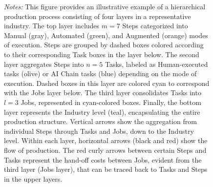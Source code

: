 \documentclass{article}
\begin{document}
\begin{figure}[ht]
\begin{center}
\begin{adjustbox}{center,trim=0pt 0pt 0pt 0pt,clip,margin=-2cm 0cm}
  \end{adjustbox}
  \end{center}

\footnotesize{\emph{Notes:} This figure provides an illustrative example of a hierarchical production process consisting of four layers in a representative industry. The top layer includes \(m=7\) Steps categorized into Manual (gray), Automated (green), and Augmented (orange) modes of execution. Steps are grouped by dashed boxes colored according to their corresponding Task boxes in the layer below. The second layer aggregates Steps into \(n=5\) Tasks, labeled as Human-executed tasks (olive) or AI Chain tasks (blue) depending on the mode of execution. Dashed boxes in this layer are colored cyan to correspond with the Jobs layer below. The third layer consolidates Tasks into \(l=3\) Jobs, represented in cyan-colored boxes. Finally, the bottom layer represents the Industry level (teal), encapsulating the entire production structure. Vertical arrows show the aggregation from individual Steps through Tasks and Jobs, down to the Industry level. Within each layer, horizontal arrows (black and red) show the flow of production. The red curly arrows between certain Steps and Tasks represent the hand-off costs between Jobs, evident from the third layer (Jobs layer), that can be traced back to Tasks and Steps in the upper layers.}

\end{figure}
\end{document}
